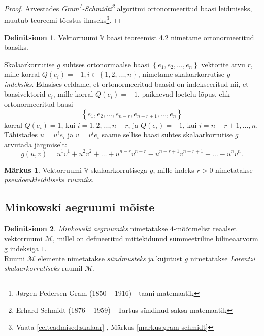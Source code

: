 \documentclass[a4paper,12pt]{article}
\theoremstyle{plain}
\theoremstyle{definition}
\newtheorem{definitsioon}{Definitsioon}[section]
\newtheorem{markus}{Märkus}[section]
\numberwithin{equation}{section}
\def\M{{\mathcal M}}
\begin{document}
\begin{proof}
Arvestades \textit{Gram\footnote{Jørgen Pedersen Gram (1850 – 1916) - taani matemaatik}-Schmidti\footnote{Erhard Schmidt (1876 – 1959) - Tartus sündinud saksa matemaatik}} algoritmi ortonormeeritud baasi leidmiseks, muutub teoreemi tõestus ilmseks\footnote{Vaata \ref{eelteadmised:skalaar} , Märkus \ref{markus:gram-schmidt}}.
\end{proof}

\begin{definitsioon}
Vektorruumi $\mathbb{V}$ baasi teoreemist 4.2 nimetame ortonormeeritud baasiks.
\end{definitsioon}

Skalaarkorrutise $g$ suhtses ortonormaalse baasi $\left\lbrace e_1, e_2, \dots, e_n \right\rbrace$ vektorite arvu $r$, mille korral $Q \left(e_i\right) = -1, i \in \left\lbrace 1, 2, \dots, n \right\rbrace$, nimetame skalaarkorrutise $g$ \emph{indeksiks}.
Edasises eeldame, et ortonormeeritud baasid on indekseeritud nii, et baasivektorid $e_i$, mille korral $Q \left(e_i\right) = -1$, paiknevad loetelu lõpus, ehk ortonormeeritud baasi 
\[\left\lbrace e_1, e_2, \dots, e_{n-r}, e_{n-r+1}, \dots, e_n \right\rbrace\]
korral $Q \left(e_i\right) = 1$, kui $i = 1, 2, \dots, n-r$, ja $Q \left(e_i\right) = -1$, kui $i = n-r+1, \dots, n$. Tähistades $u = u^i e_i$ ja $v = v^i e_i$ saame sellise baasi suhtes skalaarkorrutise $g$ arvutada järgmiselt:
\[g\left(u, v\right) = u^1 v^1 + u^2 v^2 + \dots + u^{n-r} v^{n-r} - u^{n-r+1} v^{n-r+1} - \dots - u^n v^n.\]

\begin{markus}
Vektorruumi $\mathbb{V}$ skalaarkorrutisega $g$, mille indeks $r > 0$ nimetatakse \emph{pseudoeukleidiliseks ruumiks}.
\end{markus}


\subsection{Minkowski aegruumi mõiste}

\begin{definitsioon}
\emph{Minkowski aegruumiks} nimetatakse $4$-mõõtmelist reaalset vektorruumi $\M$, millel on defineeritud mittekidunud sümmeetriline bilineaarvorm g indeksiga $1$. \\
Ruumi $\M$ elemente nimetatakse \emph{sündmusteks} ja kujutust $g$ nimetatakse \emph{Lorentzi skalaarkorrutiseks} ruumil $\M$.
\end{definitsioon}
\end{document}
